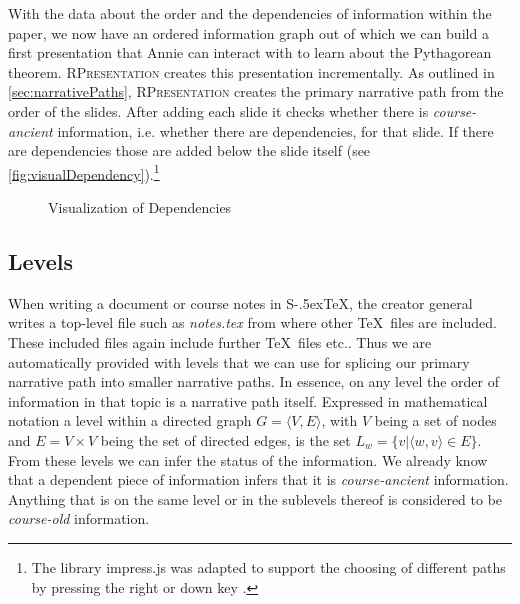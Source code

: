 \documentclass{llncs}
\def\stex{\texorpdfstring{\raisebox{-.5ex}S\kern-.5ex\TeX}{sTeX}\xspace}
\newcommand{\sys}{\textsc{RPresentation}\xspace}
\begin{document}
With the data about the order and the dependencies of information within the paper, we now
have an ordered information graph out of which we can build a first presentation that
Annie can interact with to learn about the Pytha\-go\-rean theorem. \sys creates this
presentation incrementally. As outlined in \autoref{sec:narrativePaths}, \sys creates the primary narrative path from the order
of the slides. After adding each slide it checks whether there is \textit{course-ancient}
information, i.e. whether there are dependencies, for that slide. If there are
dependencies those are added below the slide itself (see
\autoref{fig:visualDependency}).\footnote{The library impress.js was adapted to support the
  choosing of different paths by pressing the right or down key
  \cite{npentrel:npentrel15}.}

\begin{figure}[ht]\vspace{-1.5em}
  \vspace{-1.5em}
  \caption{Visualization of Dependencies}\label{fig:visualDependency}
\vspace{-2em}
\end{figure}

\subsection{Levels}
\label{sec:levels}

When writing a document or course notes in \stex, the creator general writes a top-level
file such as \textit{notes.tex} from where other \TeX\ files are included. These included
files again include further \TeX\ files etc.. Thus we are automatically provided with
levels that we can use for splicing our primary narrative path into smaller narrative
paths. In essence, on any level the order of information in that topic is a narrative path
itself. Expressed in mathematical notation a level within a directed graph
$G = \langle V, E \rangle $, with $V$ being a set of nodes and $E = V \times V$ being the
set of directed edges, is the set
$L_w = \lbrace v \vert \langle w, v \rangle \in E \rbrace$. From these levels we can infer
the status of the information. We already know that a dependent piece of information
infers that it is \textit{course-ancient} information. Anything that is on the same level
or in the sublevels thereof is considered to be \textit{course-old} information.
\end{document}
